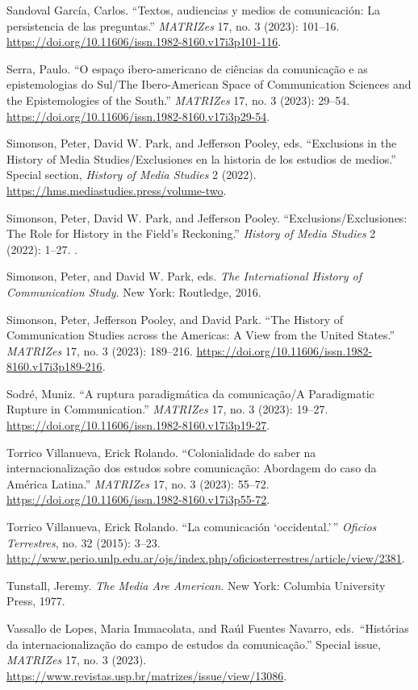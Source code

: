 \documentclass{tufte-handout}
\begin{document}
\begin{hangparas}{.25in}{1}
Sandoval García, Carlos. ``Textos, audiencias y medios de comunicación:
La persistencia de las preguntas.'' \emph{MATRIZes} 17, no. 3 (2023):
101--16. \url{https://doi.org/10.11606/issn.1982-8160.v17i3p101-116}.

Serra, Paulo. ``O espaço ibero-americano de ciências da comunicação e as
epistemologias do Sul/The Ibero-American Space of Communication Sciences
and the Epistemologies of the South.'' \emph{MATRIZes} 17, no. 3 (2023):
29--54. \url{https://doi.org/10.11606/issn.1982-8160.v17i3p29-54}.

Simonson, Peter, David W. Park, and Jefferson Pooley, eds. ``Exclusions
in the History of Media Studies/Exclusiones en la historia de los
estudios de medios.'' Special section, \emph{History of Media Studies} 2
(2022). \url{https://hms.mediastudies.press/volume-two}.

Simonson, Peter, David W. Park, and Jefferson Pooley.
``Exclusions/Exclusiones: The Role for History in the Field's
Reckoning.'' \emph{History of Media Studies} 2 (2022): 1--27. .

Simonson, Peter, and David W. Park, eds. \emph{The International History
of Communication Study}. New York: Routledge, 2016.

Simonson, Peter, Jefferson Pooley, and David Park. ``The History of
Communication Studies across the Americas: A View from the United
States.'' \emph{MATRIZes} 17, no. 3 (2023): 189--216.
\url{https://doi.org/10.11606/issn.1982-8160.v17i3p189-216}.

Sodré, Muniz. ``A ruptura paradigmática da comunicação/A Paradigmatic
Rupture in Communication.'' \emph{MATRIZes} 17, no. 3 (2023): 19--27.
\url{https://doi.org/10.11606/issn.1982-8160.v17i3p19-27}.

Torrico Villanueva, Erick Rolando. ``Colonialidade do saber na
internacionalização dos estudos sobre comunicação: Abordagem do caso da
América Latina.'' \emph{MATRIZes} 17, no. 3 (2023): 55--72.
\url{https://doi.org/10.11606/issn.1982-8160.v17i3p55-72}.

Torrico Villanueva, Erick Rolando. ``La comunicación `occidental.'\,''
\emph{Oficios Terrestres}, no. 32 (2015): 3--23.
\url{http://www.perio.unlp.edu.ar/ojs/index.php/oficiosterrestres/article/view/2381}.

Tunstall, Jeremy. \emph{The Media Are American}. New York: Columbia
University Press, 1977.

Vassallo de Lopes, Maria Immacolata, and Raúl Fuentes Navarro,
eds.~``Histórias da internacionalização do campo de estudos da
comunicação.'' Special issue, \emph{MATRIZes} 17, no. 3 (2023).
\url{https://www.revistas.usp.br/matrizes/issue/view/13086}.


\end{hangparas}
\end{document}
